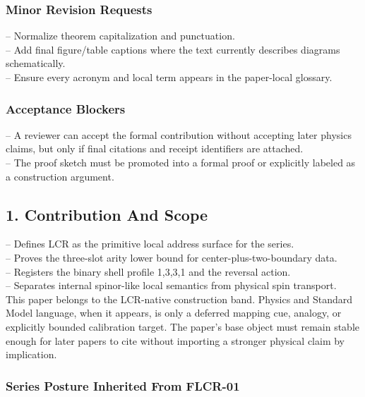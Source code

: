 \documentclass[11pt]{article}
\begin{document}
\subsubsection*{Minor Revision Requests}

\noindent{}-- Normalize theorem capitalization and punctuation.\\
\noindent{}-- Add final figure/table captions where the text currently describes diagrams schematically.\\
\noindent{}-- Ensure every acronym and local term appears in the paper-local glossary.\\

\subsubsection*{Acceptance Blockers}

\noindent{}-- A reviewer can accept the formal contribution without accepting later physics claims, but only if final citations and receipt identifiers are attached.\\
\noindent{}-- The proof sketch must be promoted into a formal proof or explicitly labeled as a construction argument.\\


\subsection*{1. Contribution And Scope}

\noindent{}-- Defines LCR as the primitive local address surface for the series.\\
\noindent{}-- Proves the three-slot arity lower bound for center-plus-two-boundary data.\\
\noindent{}-- Registers the binary shell profile 1,3,3,1 and the reversal action.\\
\noindent{}-- Separates internal spinor-like local semantics from physical spin transport.\\

This paper belongs to the LCR-native construction band. Physics and Standard Model language, when it appears, is only a deferred mapping cue, analogy, or explicitly bounded calibration target. The paper's base object must remain stable enough for later papers to cite without importing a stronger physical claim by implication.

\subsubsection*{Series Posture Inherited From FLCR-01}
\end{document}
